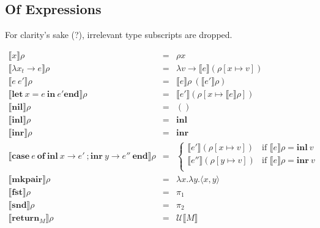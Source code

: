 \documentclass{article}[11pt]
\begin{document}
\subsection{Of Expressions}
For clarity's sake (?), irrelevant type subscripts are dropped.

\begin{eqnarray*}
\llbracket{}x\rrbracket{}\rho &=& \rho x\\
\llbracket{}\lambda x_t \rightarrow e\rrbracket \rho &=& \lambda v \rightarrow \llbracket{}e\rrbracket(\rho[x\mapsto{}v])\\
\llbracket{}e~ e'\rrbracket \rho &=& \llbracket{}e\rrbracket\rho~ (\llbracket{}e'\rrbracket\rho)\\
\llbracket{}\mathbf{let}~ x = e~ \mathbf{in}~ e' \mathbf{end}\rrbracket \rho &=& \llbracket{}e'\rrbracket (\rho[x\mapsto{}\llbracket{}e\rrbracket\rho])\\
\llbracket{}\mathbf{nil}\rrbracket \rho &=& ()\\
\llbracket{}\mathbf{inl}\rrbracket \rho &=& \mathbf{inl}\\
\llbracket{}\mathbf{inr}\rrbracket \rho &=& \mathbf{inr}\\
\llbracket{}\mathbf{case}~ e~ \mathbf{of}~ \mathbf{inl}~ x \rightarrow e' ~; \mathbf{inr}~ y \rightarrow e''~ \mathbf{end}\rrbracket \rho &=& \begin{cases}
                                                                                                                                 \llbracket e' \rrbracket (\rho[x\mapsto{}v])&\text{if } \llbracket e \rrbracket \rho = \mathbf{inl}~ v\\
                                                                                                                                 \llbracket e'' \rrbracket (\rho[y\mapsto{}v])&\text{if } \llbracket e \rrbracket \rho = \mathbf{inr}~ v\\
                                                                                                                                \end{cases}\\
\llbracket{}\mathbf{mkpair}\rrbracket{}\rho &=& \lambda x . \lambda y . \langle x,y \rangle\\
\llbracket{}\mathbf{fst}\rrbracket\rho &=& \pi_1\\
\llbracket{}\mathbf{snd}\rrbracket\rho &=& \pi_2\\
\llbracket{}\mathbf{return}_M\rrbracket{}\rho &=& \mathcal{U}\llbracket{}M\rrbracket\\

\end{eqnarray*}
\end{document}
